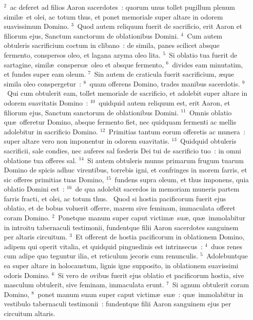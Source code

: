 ${}^{2}$~ac deferet ad filios Aaron sacerdotes~: quorum unus tollet pugillum plenum simil\ae\ et olei, ac totum thus, et ponet memoriale super altare in odorem suavissimum Domino.
${}^{3}$~Quod autem reliquum fuerit de sacrificio, erit Aaron et filiorum ejus, Sanctum sanctorum de oblationibus Domini.
${}^{4}$~Cum autem obtuleris sacrificium coctum in clibano~: de simila, panes scilicet absque fermento, conspersos oleo, et lagana azyma oleo lita.
${}^{5}$~Si oblatio tua fuerit de sartagine, simil\ae\ conspers\ae\ oleo et absque fermento,
${}^{6}$~divides eam minutatim, et fundes super eam oleum.
${}^{7}$~Sin autem de craticula fuerit sacrificium, \ae que simila oleo conspergetur~:
${}^{8}$~quam offerens Domino, trades manibus sacerdotis.
${}^{9}$~Qui cum obtulerit eam, tollet memoriale de sacrificio, et adolebit super altare in odorem suavitatis Domino~:
${}^{10}$~quidquid autem reliquum est, erit Aaron, et filiorum ejus, Sanctum sanctorum de oblationibus Domini.
${}^{11}$~Omnis oblatio qu\ae\ offeretur Domino, absque fermento fiet, nec quidquam fermenti ac mellis adolebitur in sacrificio Domino.
${}^{12}$~Primitias tantum eorum offeretis ac munera~: super altare vero non imponentur in odorem suavitatis.
${}^{13}$~Quidquid obtuleris sacrificii, sale condies, nec auferes sal fœderis Dei tui de sacrificio tuo~: in omni oblatione tua offeres sal.
${}^{14}$~Si autem obtuleris munus primarum frugum tuarum Domino de spicis adhuc virentibus, torrebis igni, et confringes in morem farris, et sic offeres primitias tuas Domino,
${}^{15}$~fundens supra oleum, et thus imponens, quia oblatio Domini est~:
${}^{16}$~de qua adolebit sacerdos in memoriam muneris partem farris fracti, et olei, ac totum thus.
~Quod si hostia pacificorum fuerit ejus oblatio, et de bobus voluerit offerre, marem sive feminam, immaculata offeret coram Domino.
${}^{2}$~Ponetque manum super caput victim\ae\ su\ae , qu\ae\ immolabitur in introitu tabernaculi testimonii, fundentque filii Aaron sacerdotes sanguinem per altaris circuitum.
${}^{3}$~Et offerent de hostia pacificorum in oblationem Domino, adipem qui operit vitalia, et quidquid pinguedinis est intrinsecus~:
${}^{4}$~duos renes cum adipe quo teguntur ilia, et reticulum jecoris cum renunculis.
${}^{5}$~Adolebuntque ea super altare in holocaustum, lignis igne supposito, in oblationem suavissimi odoris Domino.
${}^{6}$~Si vero de ovibus fuerit ejus oblatio et pacificorum hostia, sive masculum obtulerit, sive feminam, immaculata erunt.
${}^{7}$~Si agnum obtulerit coram Domino,
${}^{8}$~ponet manum suam super caput victim\ae\ su\ae~: qu\ae\ immolabitur in vestibulo tabernaculi testimonii~: fundentque filii Aaron sanguinem ejus per circuitum altaris.
